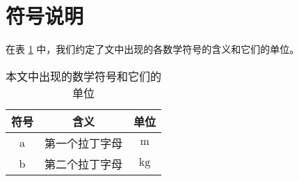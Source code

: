 \section{符号说明}

在表 \ref{symbols} 中，我们约定了文中出现的各数学符号的含义和它们的单位。

\begin{table}[htbp]
    \centering
    \begin{tabular}{ccc}
        \toprule
        符号 & 含义 & 单位 \\
        \midrule
        a & 第一个拉丁字母 & $\mathrm{m}$ \\
        b & 第二个拉丁字母 & $\mathrm{kg}$ \\
        \bottomrule 
    \end{tabular}
    \caption{本文中出现的数学符号和它们的单位}
    \label{symbols}
\end{table}